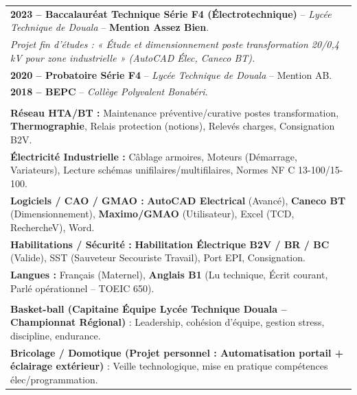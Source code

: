 \documentclass[11pt]{article}
\begin{document}
\begin{exoresolu}
\begin{center}
\begin{tabularx}{\linewidth}{|X|}
    \rowcolor{popblueL} \multicolumn{1}{|c|}{\textbf{FORMATION}} \\ \hline
    \textbf{2023 -- Baccalauréat Technique Série F4 (Électrotechnique)} -- \textit{Lycée Technique de Douala} -- \textbf{Mention Assez Bien}. \\
    \textit{Projet fin d'études : « Étude et dimensionnement poste transformation 20/0,4 kV pour zone industrielle » (AutoCAD Élec, Caneco BT).} \\
    \textbf{2020 -- Probatoire Série F4} -- \textit{Lycée Technique de Douala} -- Mention AB. \\
    \textbf{2018 -- BEPC} -- \textit{Collège Polyvalent Bonabéri}. \\ \hline
    \rowcolor{popblueL} \multicolumn{1}{|c|}{\textbf{COMPÉTENCES TECHNIQUES}} \\ \hline
    \textbf{Réseau HTA/BT :} Maintenance préventive/curative postes transformation, \textbf{Thermographie}, Relais protection (notions), Relevés charges, Consignation B2V. \\
    \textbf{Électricité Industrielle :} Câblage armoires, Moteurs (Démarrage, Variateurs), Lecture schémas unifilaires/multifilaires, Normes NF C 13-100/15-100. \\
    \textbf{Logiciels / CAO / GMAO :} \textbf{AutoCAD Electrical} (Avancé), \textbf{Caneco BT} (Dimensionnement), \textbf{Maximo/GMAO} (Utilisateur), Excel (TCD, RechercheV), Word. \\
    \textbf{Habilitations / Sécurité :} \textbf{Habilitation Électrique B2V / BR / BC} (Valide), SST (Sauveteur Secouriste Travail), Port EPI, Consignation. \\
    \textbf{Langues :} Français (Maternel), \textbf{Anglais B1} (Lu technique, Écrit courant, Parlé opérationnel -- TOEIC 650). \\ \hline
    \rowcolor{popblueL} \multicolumn{1}{|c|}{\textbf{CENTRES D'INTÉRÊT}} \\ \hline
    \textbf{Basket-ball (Capitaine Équipe Lycée Technique Douala -- Championnat Régional)} : Leadership, cohésion d'équipe, gestion stress, discipline, endurance. \\
    \textbf{Bricolage / Domotique (Projet personnel : Automatisation portail + éclairage extérieur)} : Veille technologique, mise en pratique compétences élec/programmation. \\ \hline
    \end{tabularx}
    \end{center}


\end{exoresolu}
\end{document}
